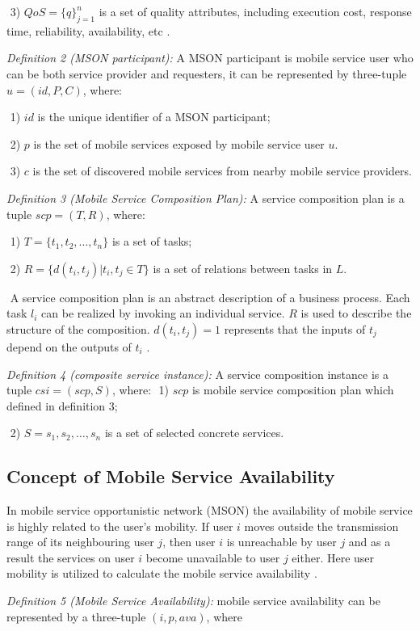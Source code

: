 \documentclass[10pt,journal,compsoc]{IEEEtran}
\begin{document}
​	3) $QoS = \{q\}^n_{j=1}$ is a set of quality attributes, including execution cost, response time, reliability, availability, etc \cite{Deng2016-2}.

\textit{Definition 2 (MSON participant):} A MSON participant is mobile service user who can be both service provider and requesters, it can be represented by three-tuple $u = (id, P, C)$, where:

​	1) $id$ is the unique identifier of a MSON participant;

​	2) $p$ is the set of mobile services exposed by mobile service user $u$.

​	3) $c$ is the set of discovered mobile services from nearby mobile service providers.

\textit{Definition 3 (Mobile Service Composition Plan):} A service composition plan is a tuple $scp = (T, R)$, where:

​	1) $T = \{t_1,t_2,…,t_n\}$ is a set of tasks;

​	2) $R = \{d(t_i,t_j)|t_i,t_j \in T\}$ is a set of relations between tasks in $L$.

​	A service composition plan is an abstract description of a business process. Each task $l_i$ can be realized by invoking an individual service. $R$ is used to describe the structure of the composition. $d(t_i, t_j) = 1$ represents that the inputs of $t_j$ depend on the outputs of $t_i$ \cite{Deng2016-2}.

\textit{Definition 4 (composite service instance):} A service composition instance is a tuple $csi = (scp, S)$, where:
​	1) $scp$ is mobile service composition plan which defined in definition 3;

​	2) $S = {s_1, s_2,…,s_n}$ is a set of selected concrete services.

\subsection{Concept of Mobile Service Availability}
In mobile service opportunistic network (MSON) the availability of mobile service is highly related to the user’s mobility. If user $i$ moves outside the transmission range of its neighbouring user $j$, then user $i$ is unreachable by user $j$ and as a result the services on user $i$ become unavailable to user $j$ either. Here user mobility is utilized to calculate the mobile service availability \cite{Yang2010}.

\textit{Definition 5 (Mobile Service Availability):} mobile service availability can be represented by a three-tuple $(i, p, ava) $, where
\end{document}
